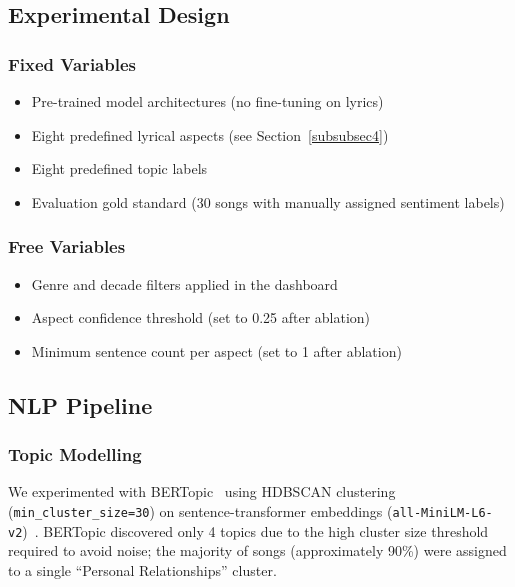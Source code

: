 \documentclass[pdflatex,sn-mathphys-num]{sn-jnl}
\begin{document}
\subsection{Experimental Design}\label{subsec4}

\subsubsection{Fixed Variables}\label{subsubsec1}

\begin{itemize}[noitemsep]
    \item Pre-trained model architectures (no fine-tuning on lyrics)
    \item Eight predefined lyrical aspects (see Section~\ref{subsubsec4})
    \item Eight predefined topic labels
    \item Evaluation gold standard (30 songs with manually assigned sentiment labels)
\end{itemize}

\subsubsection{Free Variables}\label{subsubsec2}

\begin{itemize}[noitemsep]
    \item Genre and decade filters applied in the dashboard
    \item Aspect confidence threshold (set to 0.25 after ablation)
    \item Minimum sentence count per aspect (set to 1 after ablation)
\end{itemize}

\subsection{NLP Pipeline}\label{subsec5}

\subsubsection{Topic Modelling}\label{subsubsec3}

We experimented with BERTopic~\cite{grootendorst2022bertopic} using HDBSCAN clustering (\texttt{min\_cluster\_size=30}) on sentence-transformer embeddings (\texttt{all-MiniLM-L6-v2})~\cite{reimers2019sentence}. BERTopic discovered only 4 topics due to the high cluster size threshold required to avoid noise; the majority of songs (approximately 90\%) were assigned to a single ``Personal Relationships'' cluster.
\end{document}
